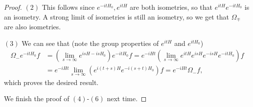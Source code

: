 \begin{proof}
  $(2)$ This follows since
  $e^{-itH_0}, e^{itH}$ are both isometries,
  so that $e^{itH} e^{-itH_0}$ is an isometry.
  A strong limit of isometries is still an isometry,
  so we get that $\Omega_{\mp}$ are also isometries.

  $(3)$ We can see that (note the group properties
  of $e^{itH}$ and $e^{itH_0}$)
  \begin{align*}
    \Omega_- e^{-it H_0} f
    &= \left(\lim_{s \to \infty} e^{isH -isH_0}\right)
    e^{-itH_0} f
    = e^{-iHt} \left(\lim_{s \to \infty} e^{itH} e^{isH} e^{-isH} e^{-itH_0}\right) f \\
    &= e^{-iHt} \lim_{s \to \infty} \left(e^{i(t + s) H} e^{-i(s + t) H_0}\right) f
    = e^{-iHt} \Omega_- f,
  \end{align*}
  which proves the desired result.

  We finish the proof of $(4)$-$(6)$ next time.
\end{proof}
